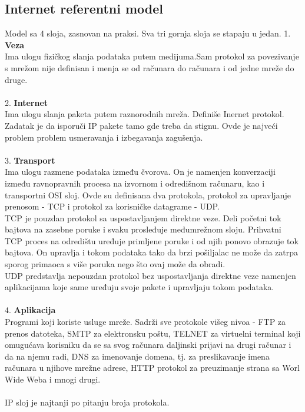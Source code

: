 \documentclass{article} %
\begin{document}
\subsection{Internet referentni model}
Model sa 4 sloja, zasnovan na praksi. Sva tri gornja sloja se stapaju u jedan.
1. \textbf{Veza}\\
Ima ulogu fizičkog slanja podataka putem medijuma.Sam protokol za povezivanje s mrežom nije definisan i menja se od računara do računara i od jedne mreže do druge. \\\\
2. \textbf{Internet}\\
Ima ulogu slanja paketa putem raznorodnih mreža. Definiše Inernet protokol. Zadatak je da isporuči IP pakete tamo gde treba da stignu. Ovde je najveći problem problem usmeravanja i izbegavanja zagušenja.\\\\
3. \textbf{Transport}\\
Ima ulogu razmene podataka između čvorova. On je namenjen konverzaciji između ravnopravnih procesa na izvornom i odredišnom računaru, kao i transportni OSI sloj. Ovde su definisana dva protokola, protokol za upravljanje prenosom - TCP i protokol za korisničke datagrame - UDP. \\
TCP je pouzdan protokol sa uspostavljanjem direktne veze. Deli početni tok bajtova na zasebne poruke i svaku prosleđuje međumrežnom sloju. Prihvatni TCP proces na odredištu uređuje primljene poruke i od njih ponovo obrazuje tok bajtova. On upravlja i tokom podataka tako da brzi pošiljalac ne može da zatrpa sporog primaoca s više poruka nego što ovaj može da obradi. \\
UDP  predstavlja nepouzdan protokol bez uspostavljanja direktne veze namenjen aplikacijama koje same uređuju svoje pakete i upravljaju tokom podataka.\\\\
4. \textbf{Aplikacija}\\
Programi koji koriste usluge mreže. Sadrži sve protokole višeg nivoa - FTP za prenos datoteka, SMTP za elektronsku poštu, TELNET za virtuelni terminal koji omugućava korisniku da se sa svog računara daljinski prijavi na drugi računar i da na njemu radi, DNS za imenovanje domena, tj. za preslikavanje imena računara u njihove mrežne adrese, HTTP protokol za preuzimanje strana sa Worl Wide Weba i mnogi drugi.
\\\\
IP sloj je najtanji po pitanju broja protokola.
\end{document}
